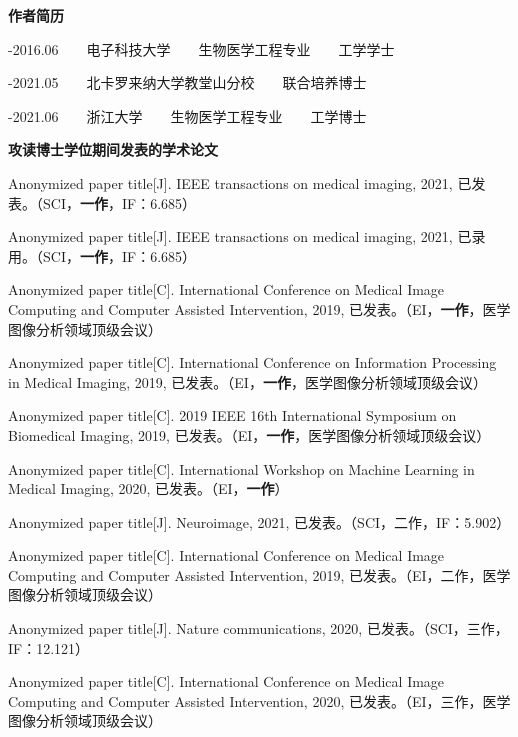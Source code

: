 \cleardoublepage
{}

\noindent \textbf{作者简历}

-2016.06~~~~电子科技大学~~~~生物医学工程专业~~~~工学学士

-2021.05~~~~北卡罗来纳大学教堂山分校~~~~联合培养博士

-2021.06~~~~浙江大学~~~~生物医学工程专业~~~~工学博士

\bigskip

\noindent \textbf{攻读博士学位期间发表的学术论文}

%
        {
        \noindent [1] Anonymized paper title[J]. IEEE transactions on medical imaging, 2021, 已发表。（SCI，\textbf{一作}，IF：6.685）
        
        \noindent [2] Anonymized paper title[J]. IEEE transactions on medical imaging, 2021, 已录用。（SCI，\textbf{一作}，IF：6.685）
        
        \noindent [3] Anonymized paper title[C]. International Conference on Medical Image Computing and Computer Assisted Intervention, 2019, 已发表。（EI，\textbf{一作}，医学图像分析领域顶级会议）
        
        \noindent [4] Anonymized paper title[C]. International Conference on Information Processing in Medical Imaging, 2019, 已发表。（EI，\textbf{一作}，医学图像分析领域顶级会议）
        
        \noindent [5] Anonymized paper title[C]. 2019 IEEE 16th International Symposium on Biomedical Imaging, 2019, 已发表。（EI，\textbf{一作}，医学图像分析领域顶级会议）
        
        \noindent [6] Anonymized paper title[C]. International Workshop on Machine Learning in Medical Imaging, 2020, 已发表。（EI，\textbf{一作}）
        
        \noindent [7] Anonymized paper title[J]. Neuroimage, 2021, 已发表。（SCI，二作，IF：5.902） 
        
        \noindent [8] Anonymized paper title[C]. International Conference on Medical Image Computing and Computer Assisted Intervention, 2019, 已发表。（EI，二作，医学图像分析领域顶级会议）
        
        \noindent [9] Anonymized paper title[J]. Nature communications, 2020, 已发表。（SCI，三作，IF：12.121）
        
        \noindent [10] Anonymized paper title[C]. International Conference on Medical Image Computing and Computer Assisted Intervention, 2020, 已发表。（EI，三作，医学图像分析领域顶级会议）
        
}
